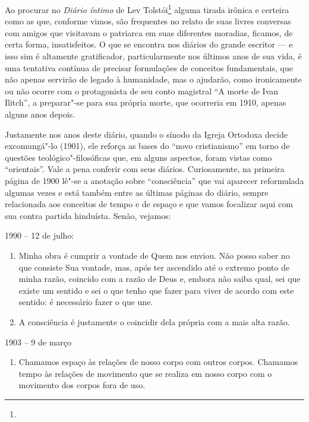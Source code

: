 Ao procurar no \emph{Diário íntimo} de Lev Tolstói\footnote{} alguma
tirada irônica e certeira como as que, conforme vimos, são frequentes no
relato de suas livres conversas com amigos que visitavam o patriarca em
suas diferentes moradias, ficamos, de certa forma, insatisfeitos. O que
se encontra nos diários do grande escritor --- e isso sim é altamente
gratificador, particularmente nos últimos anos de sua vida, é uma
tentativa contínua de precisar formulações de conceitos fundamentais,
que não apenas servirão de legado à humanidade, mas o ajudarão, como
ironicamente ou não ocorre com o protagonista de seu conto magistral ``A
morte de Ivan Ilitch'', a preparar"-se para sua própria morte, que
ocorreria em 1910, apenas alguns anos depois.

Justamente nos anos deste diário, quando o sínodo da Igreja Ortodoxa
decide excomungá"-lo (1901), ele reforça as bases do ``novo
cristianismo'' em torno de questões teológico"-filosóficas que, em alguns
aspectos, foram vistas como ``orientais''. Vale a pena conferir com seus
diários. Curiosamente, na primeira página de 1900 lê"-se a anotação sobre
``consciência'' que vai aparecer reformulada algumas vezes e está também
entre as últimas páginas do diário, sempre relacionada aos conceitos de
tempo e de espaço e que vamos focalizar aqui com sua contra partida
hinduísta. Senão, vejamos:

1990 -- 12 de julho:

\begin{enumerate}
\def\labelenumi{\arabic{enumi})}
\item
  Minha obra é cumprir a vontade de Quem nos enviou. Não posso saber no
  que consiste Sua vontade, mas, após ter ascendido até o extremo ponto
  de minha razão, coincido com a razão de Deus e, embora não saiba qual,
  sei que existe um sentido e sei o que tenho que fazer para viver de
  acordo com este sentido: é necessário fazer o que une.
\item
  A consciência é justamente o coincidir dela própria com a mais alta
  razão.
\end{enumerate}

1903 -- 9 de março

\begin{enumerate}
\def\labelenumi{\arabic{enumi})}
\setcounter{enumi}{2}
\item
  Chamamos espaço às relações de nosso corpo com outros corpos. Chamamos
  tempo às relações de movimento que se realiza em nosso corpo com o
  movimento dos corpos fora de uso.
\end{enumerate}

